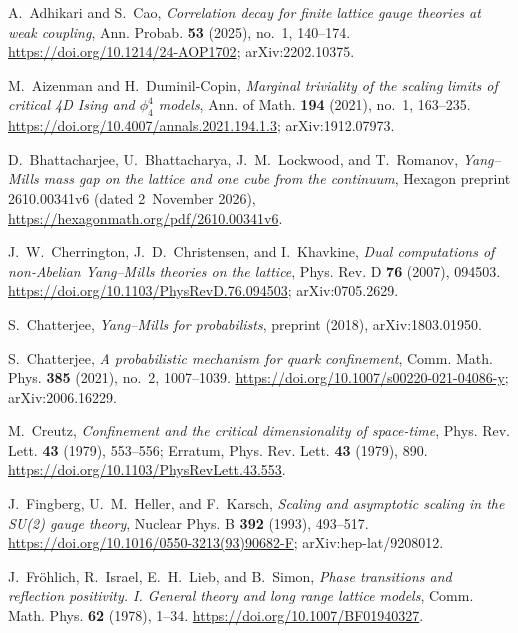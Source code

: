 
A.~Adhikari and S.~Cao, \emph{Correlation decay for finite lattice gauge theories at weak coupling},
Ann. Probab. \textbf{53} (2025), no.~1, 140--174.
\url{https://doi.org/10.1214/24-AOP1702}; arXiv:2202.10375.

M.~Aizenman and H.~Duminil-Copin, \emph{Marginal triviality of the scaling limits of critical 4D Ising and $\phi_4^4$ models},
Ann. of Math. \textbf{194} (2021), no.~1, 163--235.
\url{https://doi.org/10.4007/annals.2021.194.1.3}; arXiv:1912.07973.

D.~Bhattacharjee, U.~Bhattacharya, J.~M.~Lockwood, and T.~Romanov, \emph{Yang--Mills mass gap on the lattice and one cube from the continuum}, Hexagon preprint 2610.00341v6 (dated 2~November 2026), \url{https://hexagonmath.org/pdf/2610.00341v6}.

J.~W.~Cherrington, J.~D.~Christensen, and I.~Khavkine, \emph{Dual computations of non-Abelian Yang--Mills theories on the lattice},
Phys. Rev. D \textbf{76} (2007), 094503.
\url{https://doi.org/10.1103/PhysRevD.76.094503}; arXiv:0705.2629.

S.~Chatterjee, \emph{Yang--Mills for probabilists}, preprint (2018), arXiv:1803.01950.

S.~Chatterjee, \emph{A probabilistic mechanism for quark confinement},
Comm. Math. Phys. \textbf{385} (2021), no.~2, 1007--1039.
\url{https://doi.org/10.1007/s00220-021-04086-y}; arXiv:2006.16229.

M.~Creutz, \emph{Confinement and the critical dimensionality of space-time},
Phys. Rev. Lett. \textbf{43} (1979), 553--556; Erratum, Phys. Rev. Lett. \textbf{43} (1979), 890.
\url{https://doi.org/10.1103/PhysRevLett.43.553}.

J.~Fingberg, U.~M.~Heller, and F.~Karsch, \emph{Scaling and asymptotic scaling in the SU(2) gauge theory},
Nuclear Phys. B \textbf{392} (1993), 493--517.
\url{https://doi.org/10.1016/0550-3213(93)90682-F}; arXiv:hep-lat/9208012.

J.~Fr\"ohlich, R.~Israel, E.~H.~Lieb, and B.~Simon, \emph{Phase transitions and reflection positivity. I. General theory and long range lattice models},
Comm. Math. Phys. \textbf{62} (1978), 1--34.
\url{https://doi.org/10.1007/BF01940327}.

